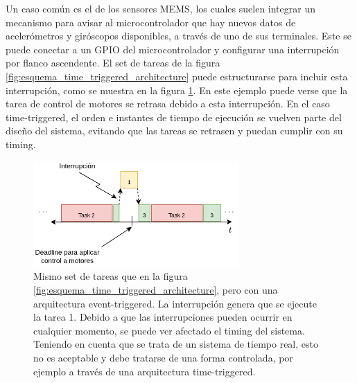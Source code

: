 Un caso común es el de los sensores MEMS, los cuales suelen integrar un mecanismo para avisar al microcontrolador que hay nuevos datos de acelerómetros y giróscopos disponibles, a través de uno de sus terminales. Este se puede conectar a un GPIO del microcontrolador y configurar una interrupción por flanco ascendente. El set de tareas de la figura \ref{fig:esquema_time_triggered_architecture} puede estructurarse para incluir esta interrupción, como se muestra en la figura \ref{fig:esquema_event_triggered_architecture}. En este ejemplo puede verse que la tarea de control de motores se retrasa debido a esta interrupción. En el caso time-triggered, el orden e instantes de tiempo de ejecución se vuelven parte del diseño del sistema, evitando que las tareas se retrasen y puedan cumplir con su timing.


\begin{figure}[!t]
    \centering
    \includegraphics[width=0.7\textwidth]{img/esquema_event_triggered_architecture.png}
    \caption{Mismo set de tareas que en la figura \ref{fig:esquema_time_triggered_architecture}, pero con una arquitectura event-triggered. La interrupción genera que se ejecute la tarea 1. Debido a que las interrupciones pueden ocurrir en cualquier momento, se puede ver afectado el timing del sistema. Teniendo en cuenta que se trata de un sistema de tiempo real, esto no es aceptable y debe tratarse de una forma controlada, por ejemplo a través de una arquitectura time-triggered.}
    \label{fig:esquema_event_triggered_architecture}
\end{figure}


